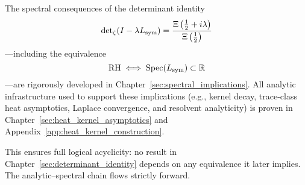 \begin{remark}
\label{rmk:forward_spectral_closure}

The spectral consequences of the determinant identity
\[
\det\nolimits_\zeta(I - \lambda L_{\mathrm{sym}}) = \frac{\Xi\left( \tfrac{1}{2} + i\lambda \right)}{\Xi\left( \tfrac{1}{2} \right)}
\]
—including the equivalence
\[
\mathrm{RH} \iff \operatorname{Spec}(L_{\mathrm{sym}}) \subset \mathbb{R}
\]
—are rigorously developed in Chapter~\ref{sec:spectral_implications}. All analytic infrastructure used to support these implications (e.g., kernel decay, trace-class heat asymptotics, Laplace convergence, and resolvent analyticity) is proven in Chapter~\ref{sec:heat_kernel_asymptotics} and Appendix~\ref{app:heat_kernel_construction}.

\medskip

\noindent
This ensures full logical acyclicity: no result in Chapter~\ref{sec:determinant_identity} depends on any equivalence it later implies. The analytic–spectral chain flows strictly forward.
\end{remark}
